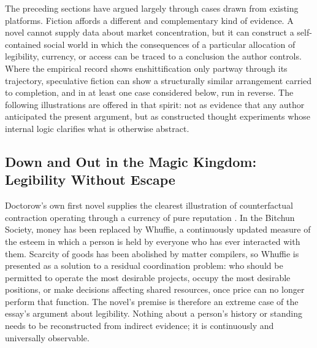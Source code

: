 \documentclass[11pt]{article}
\begin{document}
The preceding sections have argued largely through cases drawn from existing platforms. Fiction affords a different and complementary kind of evidence. A novel cannot supply data about market concentration, but it can construct a self-contained social world in which the consequences of a particular allocation of legibility, currency, or access can be traced to a conclusion the author controls. Where the empirical record shows enshittification only partway through its trajectory, speculative fiction can show a structurally similar arrangement carried to completion, and in at least one case considered below, run in reverse. The following illustrations are offered in that spirit: not as evidence that any author anticipated the present argument, but as constructed thought experiments whose internal logic clarifies what is otherwise abstract.

\subsection{Down and Out in the Magic Kingdom: Legibility Without Escape}

Doctorow's own first novel supplies the clearest illustration of counterfactual contraction operating through a currency of pure reputation \parencite{doctorow2003magickingdom}. In the Bitchun Society, money has been replaced by Whuffie, a continuously updated measure of the esteem in which a person is held by everyone who has ever interacted with them. Scarcity of goods has been abolished by matter compilers, so Whuffie is presented as a solution to a residual coordination problem: who should be permitted to operate the most desirable projects, occupy the most desirable positions, or make decisions affecting shared resources, once price can no longer perform that function. The novel's premise is therefore an extreme case of the essay's argument about legibility. Nothing about a person's history or standing needs to be reconstructed from indirect evidence; it is continuously and universally observable.
\end{document}
